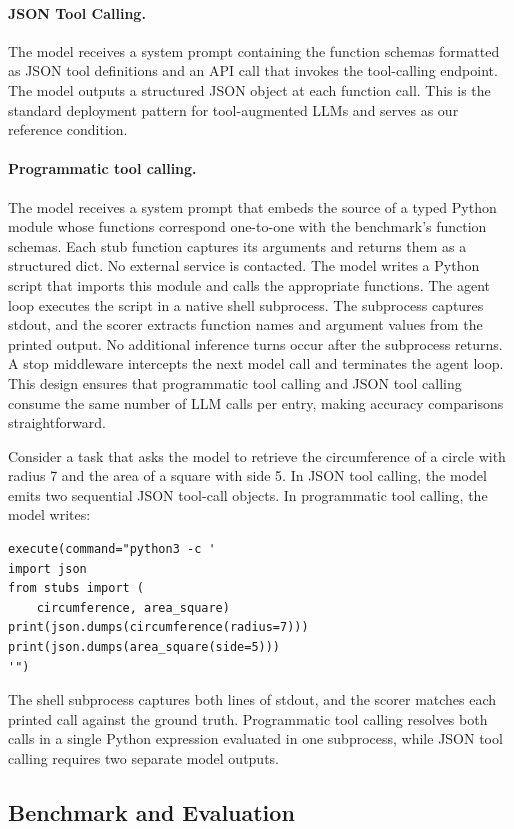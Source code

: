 \documentclass[11pt]{article}
\newcommand{\codemode}{programmatic tool calling}
\newcommand{\Codemode}{Programmatic tool calling}
\begin{document}
\paragraph{JSON Tool Calling.}
The model receives a system prompt containing the function schemas formatted as
JSON tool definitions and an API call that invokes the tool-calling endpoint.
The model outputs a structured JSON object at each function call.
This is the standard deployment pattern for tool-augmented LLMs and serves as
our reference condition.

\paragraph{\Codemode{}.}
The model receives a system prompt that embeds the source of a typed Python
module whose functions correspond one-to-one with the benchmark's function
schemas.
Each stub function captures its arguments and returns them as a structured dict.
No external service is contacted.
The model writes a Python script that imports this module and calls the
appropriate functions.
The agent loop executes the script in a native shell subprocess. The subprocess
captures stdout, and the scorer extracts function names and argument values
from the printed output.
No additional inference turns occur after the subprocess returns. A stop
middleware intercepts the next model call and terminates the agent loop.
This design ensures that \codemode{} and JSON tool calling consume the same number of LLM
calls per entry, making accuracy comparisons straightforward.

Consider a task that asks the model to retrieve the circumference of a circle
with radius 7 and the area of a square with side 5.
In JSON tool calling, the model emits two sequential JSON tool-call objects.
In \codemode{}, the model writes:

{\small\begin{verbatim}
execute(command="python3 -c '
import json
from stubs import (
    circumference, area_square)
print(json.dumps(circumference(radius=7)))
print(json.dumps(area_square(side=5)))
'")
\end{verbatim}
}

The shell subprocess captures both lines of stdout, and the scorer
matches each printed call against the ground truth.
\Codemode{} resolves both calls in a single
Python expression evaluated in one subprocess, while JSON tool calling requires two
separate model outputs.

\subsection{Benchmark and Evaluation}
\end{document}
